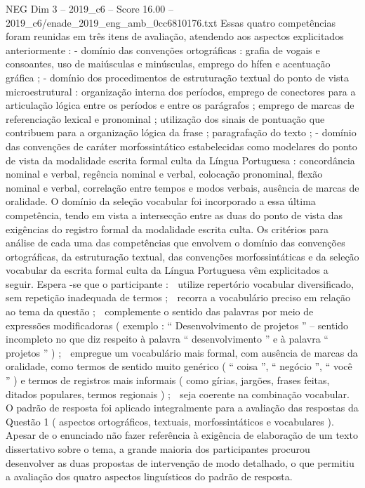 \begin{textsample}{NEG Dim 3 – 2019\_c6 – Score 16.00 – 2019\_c6/enade\_2019\_eng\_amb\_0cc6810176.txt}
Essas quatro competências foram reunidas em três itens de avaliação, atendendo aos aspectos explicitados anteriormente : - domínio das convenções ortográficas : grafia de vogais e consoantes, uso de maiúsculas e minúsculas, emprego do hífen e acentuação gráfica ; - domínio dos procedimentos de estruturação textual do ponto de vista microestrutural : organização interna dos períodos, emprego de conectores para a articulação lógica entre os períodos e entre os parágrafos ; emprego de marcas de referenciação lexical e pronominal ; utilização dos sinais de pontuação que contribuem para a organização lógica da frase ; paragrafação do texto ; - domínio das convenções de caráter morfossintático estabelecidas como modelares do ponto de vista da modalidade escrita formal culta da Língua Portuguesa : concordância nominal e verbal, regência nominal e verbal, colocação pronominal, flexão nominal e verbal, correlação entre tempos e modos verbais, ausência de marcas de oralidade.
O domínio da seleção vocabular foi incorporado a essa última competência, tendo em vista a intersecção entre as duas do ponto de vista das exigências do registro formal da modalidade escrita culta.
Os critérios para análise de cada uma das competências que envolvem o domínio das convenções ortográficas, da estruturação textual, das convenções morfossintáticas e da seleção vocabular da escrita formal culta da Língua Portuguesa vêm explicitados a seguir.
Espera -se que o participante :  utilize repertório vocabular diversificado, sem repetição inadequada de termos ;  recorra a vocabulário preciso em relação ao tema da questão ;  complemente o sentido das palavras por meio de expressões modificadoras ( exemplo : “ Desenvolvimento de projetos ” – sentido incompleto no que diz respeito à palavra “ desenvolvimento ” e à palavra “ projetos ” ) ;  empregue um vocabulário mais formal, com ausência de marcas da oralidade, como termos de sentido muito genérico ( “ coisa ”, “ negócio ”, “ você ” ) e termos de registros mais informais ( como gírias, jargões, frases feitas, ditados populares, termos regionais ) ;  seja coerente na combinação vocabular.
O padrão de resposta foi aplicado integralmente para a avaliação das respostas da Questão 1 ( aspectos ortográficos, textuais, morfossintáticos e vocabulares ).
Apesar de o enunciado não fazer referência à exigência de elaboração de um texto dissertativo sobre o tema, a grande maioria dos participantes procurou desenvolver as duas propostas de intervenção de modo detalhado, o que permitiu a avaliação dos quatro aspectos linguísticos do padrão de resposta.

\end{textsample}
